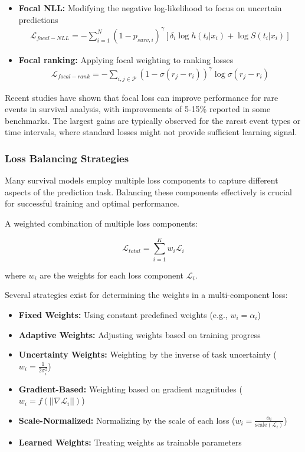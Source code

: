 \begin{itemize}
\item \textbf{Focal NLL:} Modifying the negative log-likelihood to focus on uncertain predictions
  \begin{align}
    \mathcal{L}_{focal-NLL} = -\sum_{i=1}^N (1-p_{surv,i})^\gamma [\delta_i \log h(t_i|x_i) + \log S(t_i|x_i)]
  \end{align}

\item \textbf{Focal ranking:} Applying focal weighting to ranking losses
  \begin{align}
    \mathcal{L}_{focal-rank} = -\sum_{i,j \in \mathcal{P}} (1-\sigma(r_j - r_i))^\gamma \log \sigma(r_j - r_i)
  \end{align}
\end{itemize}

Recent studies have shown that focal loss can improve performance for rare events in survival analysis, with improvements of 5-15\% reported in some benchmarks. The largest gains are typically observed for the rarest event types or time intervals, where standard losses might not provide sufficient learning signal.

\subsubsection{Loss Balancing Strategies}

Many survival models employ multiple loss components to capture different aspects of the prediction task. Balancing these components effectively is crucial for successful training and optimal performance.

\begin{definitionbox}[title=Loss Balancing]
  A weighted combination of multiple loss components:

  \begin{equation}
    \mathcal{L}_{total} = \sum_{i=1}^K w_i \mathcal{L}_i
  \end{equation}

  where $w_i$ are the weights for each loss component $\mathcal{L}_i$.
\end{definitionbox}

Several strategies exist for determining the weights in a multi-component loss:

\begin{itemize}
\item \textbf{Fixed Weights:} Using constant predefined weights (e.g., $w_i = \alpha_i$)
\item \textbf{Adaptive Weights:} Adjusting weights based on training progress
\item \textbf{Uncertainty Weights:} Weighting by the inverse of task uncertainty ($w_i = \frac{1}{2\sigma_i^2}$)
\item \textbf{Gradient-Based:} Weighting based on gradient magnitudes ($w_i = f(||\nabla \mathcal{L}_i||)$)
\item \textbf{Scale-Normalized:} Normalizing by the scale of each loss ($w_i = \frac{\alpha_i}{\text{scale}(\mathcal{L}_i)}$)
\item \textbf{Learned Weights:} Treating weights as trainable parameters
\end{itemize}

